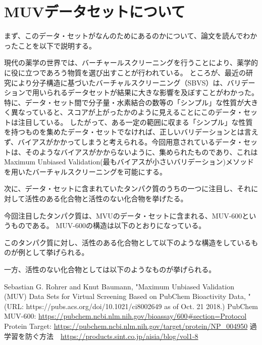 \documentclass[a4j,11pt]{jarticle}
\begin{document}
\newpage

\section{MUVデータセットについて}

まず、このデータ・セットがなんのためにあるのかについて、論文\cite{thesis}を読んでわかったことを以下で説明する。


現代の薬学の世界では、バーチャールスクリーニングを行うことにより、薬学的に役に立つであろう物質を選び出すことが行われている。
ところが、最近の研究により分子構造に基づいたバーチャルスクリーニング（SBVS）は、バリデーションで用いられるデータセットが結果に大きな影響を及ぼすことがわかった。特に、データ・セット間で分子量・水素結合の数等の「シンプル」な性質が大きく異なっていると、スコアが上がったかのように見えることにこのデータ・セットは注目している。
したがって、ある一定の範囲に収まる「シンプル」な性質を持つものを集めたデータ・セットでなければ、正しいバリデーションとは言えず、バイアスがかかってしまうと考えられる。今回用意されているデータ・セットは、そのようなバイアスがかからないように、集められたものであり、これはMaximum Unbiased Validation(最もバイアスが小さいバリデーション)メソッドを用いたバーチャルスクリーニングを可能にする。


次に、データ・セットに含まれていたタンパク質のうちの一つに注目し、それに対して活性のある化合物と活性のない化合物を挙げたる。

今回注目したタンパク質は、MVUのデータ・セットに含まれる、MUV-600というものである。
MUV-600の構造は以下のとおりになっている。
\cite{MUV-600}

このタンパク質に対し、活性のある化合物として以下のような構造をしているものが例として挙げられる。

一方、活性のない化合物としては以下のようなものが挙げられる。

\begin{thebibliography}{9}
	 Sebastian G. Rohrer and Knut Baumann, "Maximum Unbiased Validation (MUV) Data Sets for Virtual Screening Based on PubChem Bioactivity Data, " (URL: https://pubs.acs.org/doi/10.1021/ci8002649 as of Oct. 21 2018.)
	 PubChem MUV-600: \url{https://pubchem.ncbi.nlm.nih.gov/bioassay/600#section=Protocol} Protein Target: \url{https://pubchem.ncbi.nlm.nih.gov/target/protein/NP_004950}
	 過学習を防ぐ方法　\url{https://products.sint.co.jp/aisia/blog/vol1-8}
\end{thebibliography}
\end{document}
